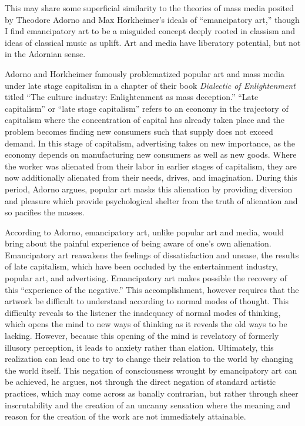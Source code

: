 \documentclass[12pt,letterpaper]{article}
\begin{document}
	This may share some superficial similarity to the theories of mass media
	posited by Theodore Adorno and Max Horkheimer's ideals of ``emancipatory
	art,'' though I find emancipatory art to be a 
	misguided concept deeply rooted in classism and ideas of classical music
	as uplift. Art and media have liberatory potential, but not in the
	Adornian sense. 
	
	Adorno and Horkheimer famously problematized popular art and
	mass media under late stage capitalism in a chapter of their book 
	\textit{Dialectic of Enlightenment} titled ``The culture industry: 
	Enlightenment as mass deception.''\autocite{Adorno} ``Late capitalism'' 
	or ``late stage capitalism'' 
	refers to an economy in the trajectory of capitalism where the 
	concentration of capital has already taken place and the problem 
	becomes finding new consumers such that supply does not exceed demand. 
	In this stage of capitalism, advertising takes on new importance, as
	the economy depends on manufacturing new consumers as well as new 
	goods.\autocite[66]{Baugh}
	Where the worker was alienated from their labor in earlier stages of 
	capitalism, they are now additionally
	alienated from their needs, drives, and imagination.\autocite[66]{Baugh}
	During this period, Adorno argues, popular art masks this alienation 
	by providing diversion and pleasure which provide psychological shelter
	from the truth of alienation and so pacifies the
	masses.\autocite[67]{Baugh}

	According to Adorno, emancipatory art, unlike popular art and media, 
	would bring about the painful experience of being aware of one's own 
	alienation. Emancipatory art reawakens the feelings of dissatisfaction 
	and unease, the results of late capitalism, which have been occluded by
	the entertainment industry, popular art, and advertising. Emancipatory 
	art makes possible the recovery of this ``experience of the negative.''
	This accomplishment, however requires that the artwork be difficult to 
	understand according to normal modes of thought. This difficulty reveals
	to the listener the inadequacy of normal modes of thinking, which opens 
	the mind to new ways of thinking as it reveals the old ways to be 
	lacking. However, because this opening of the mind is revelatory of 
	formerly illusory perception, it leads to anxiety rather than elation. 
	Ultimately, this realization can lead one to try to change their 
	relation to the world by changing the world 
	itself.\autocite[67--69]{Baugh}    
	This negation of consciousness wrought by emancipatory art can be 
	achieved, he argues, not through the direct negation of standard 
	artistic practices, which may come across as banally contrarian, but 
	rather through sheer inscrutability and the creation of an uncanny 
	sensation where the meaning and reason for the creation of the work are
	not immediately attainable.\autocite[71]{Baugh}
	
\end{document}
